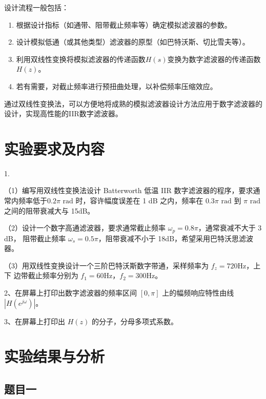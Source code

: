 \documentclass[12pt,hyperref,a4paper,UTF8]{ctexart}
\begin{document}
设计流程一般包括：
\begin{enumerate}
    \item 根据设计指标（如通带、阻带截止频率等）确定模拟滤波器的参数。
    \item 设计模拟低通（或其他类型）滤波器的原型（如巴特沃斯、切比雪夫等）。
    \item 利用双线性变换将模拟滤波器的传递函数$H(s)$变换为数字滤波器的传递函数$H(z)$。
    \item 若有需要，对截止频率进行预扭曲处理，以补偿频率压缩效应。
\end{enumerate}

通过双线性变换法，可以方便地将成熟的模拟滤波器设计方法应用于数字滤波器的设计，实现高性能的IIR数字滤波器。



\section{实验要求及内容}

1.

（1）编写用双线性变换法设计 Batterworth 低温 IIR 数字滤波器的程序，要求通常内频率低于$0.2\pi$ $\mathrm{rad}$ 时，容许幅度误差在 1 dB 之内，频率在 $0.3\pi$ $\mathrm{rad}$ 到 $\pi$ $\mathrm{rad}$ 之间的阻带衰减大与 15dB。

（2）设计一个数字高通滤波器，要求通常截止频率 $\omega_p = 0.8\pi$，通常衰减不大于 3 dB，
阻带截止频率 $\omega_s = 0.5\pi$，阻带衰减不小于 18dB，希望采用巴特沃思滤波器。

（3）用双线性变换设计一个三阶巴特沃斯数字带通，采样频率为 $f_z = 720 \mathrm{Hz}$，上下
边带截止频率分别为 $f_1 = 60 \mathrm{Hz}$，$f_2 = 300 \mathrm{Hz}$。

2、在屏幕上打印出数字滤波器的频率区间 $[0, \pi]$ 上的幅频响应特性由线 $|H(e^{j\omega})|$。

3、在屏幕上打印出 $H(z)$ 的分子，分母多项式系数。


\section{实验结果与分析}

\subsection{题目一}
\end{document}
